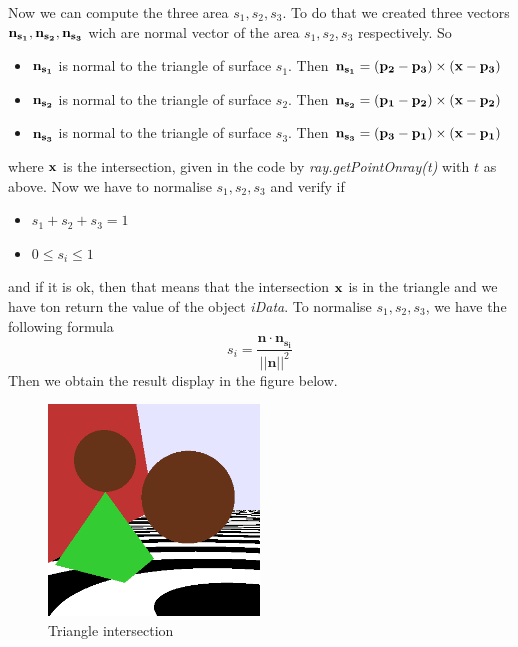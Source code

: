 \documentclass[10pt,a4paper]{report}
\begin{document}
Now we can compute the three area $s_1, s_2, s_3$. To do that we created three vectors $\bf n_{s_1}, n_{s_2}, n_{s_3}$ wich are normal vector of the area $s_1, s_2, s_3$ respectively. So
\begin{itemize}
\item $\bf n_{s_1}$ is normal to the triangle of surface $s_1$. Then $\bf n_{s_1} = (\bf p_2-p_3) \times (x - p_3)$
\item $\bf n_{s_2}$ is normal to the triangle of surface $s_2$. Then $\bf n_{s_2} = (\bf p_1-p_2) \times (x - p_2)$
\item $\bf n_{s_3}$ is normal to the triangle of surface $s_3$. Then $\bf n_{s_3} = (\bf p_3-p_1) \times (x - p_1)$
\end{itemize}
where $\bf x$ is the intersection, given in the code by \textit{ray.getPointOnray(t)} with $t$ as above.
Now we have to normalise $s_1, s_2, s_3$ and verify if 
\begin{itemize}
\item $s_1 + s_2 + s_3 = 1$
\item $0 \leq s_i \leq 1$
\end{itemize}
and if it is ok, then that means that the intersection $\bf x$ is in the triangle and we have ton return the value of the object \textit{iData}.
To normalise $s_1, s_2, s_3$, we have the following formula $$s_i = \frac{\mathbf{n}\cdot \mathbf{n_{s_i}}}{||\mathbf{n}||^2}$$
\newpage
Then we obtain the result display in the figure below.
\begin{figure}[h!]
\caption{Triangle intersection}
  \centering
    \includegraphics[width=0.5\textwidth]{Framework/Image1_4_2.png}
\end{figure}
\end{document}
